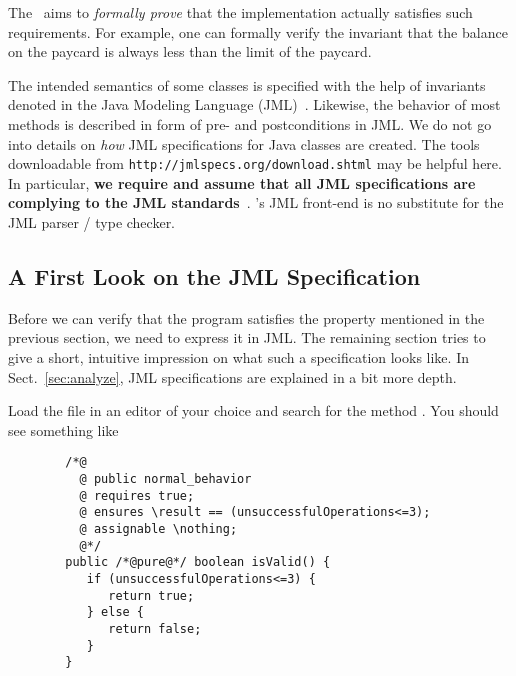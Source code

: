 The \kt\ aims to {\em formally prove} that the implementation actually
satisfies such requirements.  For example, one can formally verify the
invariant that the balance on the paycard is always less than the
limit of the paycard.

The intended semantics of some classes is specified with the help of
invariants denoted in the Java Modeling Language
(JML)~\cite{JMLReferenceManual11,Leavens-Baker-Ruby04}. Likewise, the
behavior of most methods is described in form of pre- and postconditions
in JML. We do not go into details on \emph{how} JML specifications
for Java classes are created. The tools downloadable from
\texttt{http://jmlspecs.org/download.shtml} may be helpful here. In
particular, \textbf{we require and assume that all JML specifications
  are complying to the JML standards}~\cite{JMLReferenceManual11}. \KeY's
JML front-end is no substitute for the JML parser / type checker.

%

\subsection{A First Look on the JML Specification}
\label{tutorialExample:firstLook}

Before we can verify that the program satisfies the property mentioned
in the previous section, we need to express it in JML. The remaining
section tries to give a short, intuitive impression on what such a
specification looks like. In Sect.~\ref{sec:analyze}, JML
specifications are explained in a bit more depth.

Load the file  in an editor of your choice and search
for the method . You should see something like

\lstset{
  language=Java,
  columns=flexible,
  commentstyle=\ttfamily,
  keywordstyle=\ttfamily\bfseries
}

\begin{lstlisting}
        /*@
          @ public normal_behavior
          @ requires true;
          @ ensures \result == (unsuccessfulOperations<=3); 
          @ assignable \nothing;
          @*/
        public /*@pure@*/ boolean isValid() {
           if (unsuccessfulOperations<=3) {
              return true;
           } else {
              return false;
           }
        } 
\end{lstlisting}

